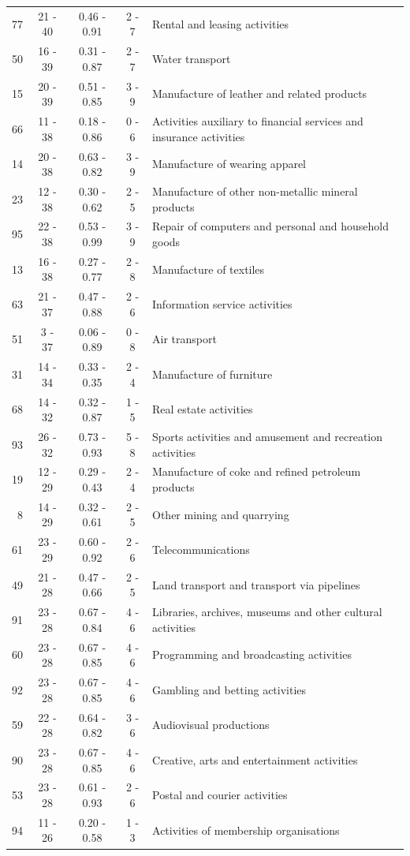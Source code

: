 \begin{table}[htbp]
\begin{threeparttable}
\begin{tabular}{r|c|c|c|l}
77&	21 - 40&	0.46 - 0.91&	2 - 7&	Rental and leasing activities\\
50&	16 - 39&	0.31 - 0.87&	2 - 7&	Water transport\\
15&	20 - 39&	0.51 - 0.85&	3 - 9&	Manufacture of leather and related products\\
66&	11 - 38&	0.18 - 0.86&	0 - 6&	Activities auxiliary to financial services and insurance activities\\
14&	20 - 38&	0.63 - 0.82&	3 - 9&	Manufacture of wearing apparel\\
23&	12 - 38&	0.30 - 0.62&	2 - 5&	Manufacture of other non-metallic mineral products\\
95&	22 - 38&	0.53 - 0.99&	3 - 9&	Repair of computers and personal and household goods\\
13&	16 - 38&	0.27 - 0.77&	2 - 8&	Manufacture of textiles\\
63&	21 - 37&	0.47 - 0.88&	2 - 6&	Information service activities\\
51&	3 - 37&	0.06 - 0.89&	0 - 8&	Air transport\\
31&	14 - 34&	0.33 - 0.35&	2 - 4&	Manufacture of furniture\\
68&	14 - 32&	0.32 - 0.87&	1 - 5&	Real estate activities\\
93&	26 - 32&	0.73 - 0.93&	5 - 8&	Sports activities and amusement and recreation activities\\
19&	12 - 29&	0.29 - 0.43&	2 - 4&	Manufacture of coke and refined petroleum products\\
8&	14 - 29&	0.32 - 0.61&	2 - 5&	Other mining and quarrying\\
61&	23 - 29&	0.60 - 0.92&	2 - 6&	Telecommunications\\
49&	21 - 28&	0.47 - 0.66&	2 - 5&	Land transport and transport via pipelines\\
91&	23 - 28&	0.67 - 0.84&	4 - 6&	Libraries, archives, museums and other cultural activities\\
60&	23 - 28&	0.67 - 0.85&	4 - 6&	Programming and broadcasting activities\\
92&	23 - 28&	0.67 - 0.85&	4 - 6&	Gambling and betting activities\\
59&	22 - 28&	0.64 - 0.82&	3 - 6&	Audiovisual productions\\
90&	23 - 28&	0.67 - 0.85&	4 - 6&	Creative, arts and entertainment activities\\
53&	23 - 28&	0.61 - 0.93&	2 - 6&	Postal and courier activities\\
94&	11 - 26&	0.20 - 0.58&	1 - 3&	Activities of membership organisations\\

\end{tabular}
\end{threeparttable}
\end{table}
